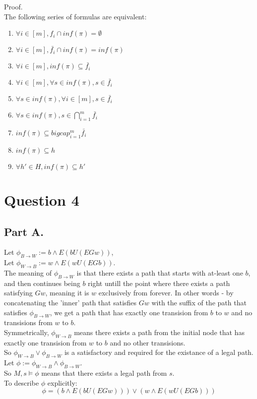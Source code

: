 \documentclass{article}
\begin{document}
Proof.\\
The following series of formulas are equivalent:
\begin{enumerate}
    \item $\forall i\in[m], f_i\cap inf(\pi)=\emptyset$
    \item $\forall i\in[m], \bar{f_i}\cap inf(\pi)=inf(\pi)$
    \item $\forall i\in[m], inf(\pi)\subseteq \bar{f_i}$
    \item $\forall i\in[m], \forall s\in inf(\pi),s\in\bar{f_i}$
    \item $\forall s\in inf(\pi), \forall i\in[m],s\in\bar{f_i}$
    \item $\forall s\in inf(\pi), s\in\bigcap_{i=1}^m\bar{f_i}$
    \item $inf(\pi)\subseteq bigcap_{i=1}^m\bar{f_i}$
    \item $inf(\pi)\subseteq h$
    \item $\forall h'\in H, inf(\pi)\subseteq h'$
\end{enumerate}

\section*{Question 4}
\subsection*{Part A.}
Let $\phi_{B\rightarrow W}:=b\wedge E(bU(EGw))$,\\
Let $\phi_{W\rightarrow B}:=w\wedge E(wU(EGb))$.\\
The meaning of $\phi_{B\rightarrow W}$ is that there exists 
a path that starts with at-least one $b$, and then continues
being $b$ right untill the point where there exists a path satisfying $Gw$, meaning it
is $w$ exclusively from forever. In other words - 
by concatenating the 'inner' path that satisfies $Gw$ with the suffix of
the path that satisfies $\phi_{B\rightarrow W}$, we get a path
that has exactly one transision from $b$ to $w$ and no
transisions from $w$ to $b$.\\
Symmetrically, $\phi_{W\rightarrow B}$ means there exists a path
from the initial node that has
exactly one transision from $w$ to $b$ and no other transisions.\\
So $\phi_{W\rightarrow B}\vee \phi_{B\rightarrow W}$ is a 
satisfactory and required for the existance of a legal path.\\
Let $\phi:=\phi_{W\rightarrow B}\wedge \phi_{B\rightarrow W}$.\\
So $M,s\models \phi$ means that there exists a legal path from $s$.\\
To describe $\phi$ explicitly: 
\[
    \phi=
    (b\wedge E(bU(EGw)))\vee
    (w\wedge E(wU(EGb)))
\]
\end{document}
